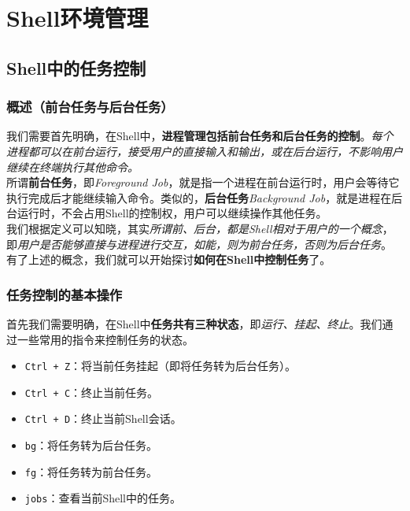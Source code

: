 \chapter{Shell环境管理}
\label{cp:shellmgr}

\section{Shell中的任务控制}

\subsection{概述（前台任务与后台任务）}

我们需要首先明确，在Shell中，\textbf{进程管理包括前台任务和后台任务的控制}。\textit{每个进程都可以在前台运行，接受用户的直接输入和输出，或在后台运行，不影响用户继续在终端执行其他命令。}\\

所谓\textbf{前台任务}，即\textit{Foreground Job}，就是指一个进程在前台运行时，用户会等待它执行完成后才能继续输入命令。类似的，\textbf{后台任务}\textit{Background Job}，就是进程在后台运行时，不会占用Shell的控制权，用户可以继续操作其他任务。\\

我们根据定义可以知晓，其实\textit{所谓前、后台，都是Shell相对于用户的一个概念}，即\textit{用户是否能够直接与进程进行交互，如能，则为前台任务，否则为后台任务}。\\

有了上述的概念，我们就可以开始探讨\textbf{如何在Shell中控制任务}了。

\subsection{任务控制的基本操作}

首先我们需要明确，在Shell中\textbf{任务共有三种状态}，即\textit{运行、挂起、终止}。我们通过一些常用的指令来控制任务的状态。

\begin{itemize}
    \item \texttt{Ctrl + Z}：将当前任务挂起（即将任务转为后台任务）。
    \item \texttt{Ctrl + C}：终止当前任务。
    \item \texttt{Ctrl + D}：终止当前Shell会话。
    \item \texttt{bg}：将任务转为后台任务。
    \item \texttt{fg}：将任务转为前台任务。
    \item \texttt{jobs}：查看当前Shell中的任务。
\end{itemize}

